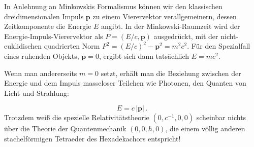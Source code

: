 In Anlehnung an Minkowskis Formalismus können wir den klassischen dreidimensionalen Impuls $\mathbf{p}$ zu einem Vierervektor verallgemeinern, dessen Zeitkomponente die Energie $E$ angibt. In der Minkowski-Raumzeit wird der Energie-Impuls-Vierervektor als $P = (E/c, \mathbf{p})$ ausgedrückt, mit der nicht-euklidischen quadrierten Norm $P^2=(E/c)^2 - \mathbf{p}^2 = m^2c^2$. Für den Spezialfall eines ruhenden Objekts, $\mathbf{p} = 0$, ergibt sich dann tatsächlich $E=m c^2$.

Wenn man andererseits $m=0$ setzt, erhält man die Beziehung zwischen der Energie und dem Impuls masseloser Teilchen wie Photonen, den Quanten von Licht und Strahlung:

\begin{equation*}\label{emc2}
  E=c\, |\mathbf{p}|\,.
\end{equation*}
%
Trotzdem weiß die spezielle Relativitätstheorie $(0,c^{-1},0,0)$ scheinbar nichts über die Theorie der Quantenmechanik $(0,0,h,0)$, die einem völlig anderen stachelförmigen Tetraeder des Hexadekachors entspricht!
